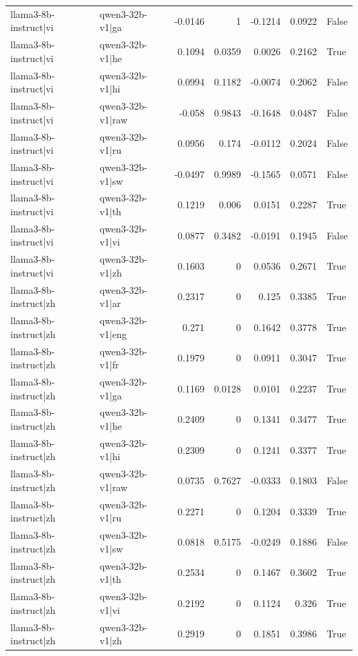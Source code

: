\begin{table}
\begin{tabular}{l l r r r r l}
llama3-8b-instruct|vi & qwen3-32b-v1|ga & -0.0146 & 1 & -0.1214 & 0.0922 & False \\
llama3-8b-instruct|vi & qwen3-32b-v1|he & 0.1094 & 0.0359 & 0.0026 & 0.2162 & True \\
llama3-8b-instruct|vi & qwen3-32b-v1|hi & 0.0994 & 0.1182 & -0.0074 & 0.2062 & False \\
llama3-8b-instruct|vi & qwen3-32b-v1|raw & -0.058 & 0.9843 & -0.1648 & 0.0487 & False \\
llama3-8b-instruct|vi & qwen3-32b-v1|ru & 0.0956 & 0.174 & -0.0112 & 0.2024 & False \\
llama3-8b-instruct|vi & qwen3-32b-v1|sw & -0.0497 & 0.9989 & -0.1565 & 0.0571 & False \\
llama3-8b-instruct|vi & qwen3-32b-v1|th & 0.1219 & 0.006 & 0.0151 & 0.2287 & True \\
llama3-8b-instruct|vi & qwen3-32b-v1|vi & 0.0877 & 0.3482 & -0.0191 & 0.1945 & False \\
llama3-8b-instruct|vi & qwen3-32b-v1|zh & 0.1603 & 0 & 0.0536 & 0.2671 & True \\
llama3-8b-instruct|zh & qwen3-32b-v1|ar & 0.2317 & 0 & 0.125 & 0.3385 & True \\
llama3-8b-instruct|zh & qwen3-32b-v1|eng & 0.271 & 0 & 0.1642 & 0.3778 & True \\
llama3-8b-instruct|zh & qwen3-32b-v1|fr & 0.1979 & 0 & 0.0911 & 0.3047 & True \\
llama3-8b-instruct|zh & qwen3-32b-v1|ga & 0.1169 & 0.0128 & 0.0101 & 0.2237 & True \\
llama3-8b-instruct|zh & qwen3-32b-v1|he & 0.2409 & 0 & 0.1341 & 0.3477 & True \\
llama3-8b-instruct|zh & qwen3-32b-v1|hi & 0.2309 & 0 & 0.1241 & 0.3377 & True \\
llama3-8b-instruct|zh & qwen3-32b-v1|raw & 0.0735 & 0.7627 & -0.0333 & 0.1803 & False \\
llama3-8b-instruct|zh & qwen3-32b-v1|ru & 0.2271 & 0 & 0.1204 & 0.3339 & True \\
llama3-8b-instruct|zh & qwen3-32b-v1|sw & 0.0818 & 0.5175 & -0.0249 & 0.1886 & False \\
llama3-8b-instruct|zh & qwen3-32b-v1|th & 0.2534 & 0 & 0.1467 & 0.3602 & True \\
llama3-8b-instruct|zh & qwen3-32b-v1|vi & 0.2192 & 0 & 0.1124 & 0.326 & True \\
llama3-8b-instruct|zh & qwen3-32b-v1|zh & 0.2919 & 0 & 0.1851 & 0.3986 & True \\

\end{tabular}
\end{table}
